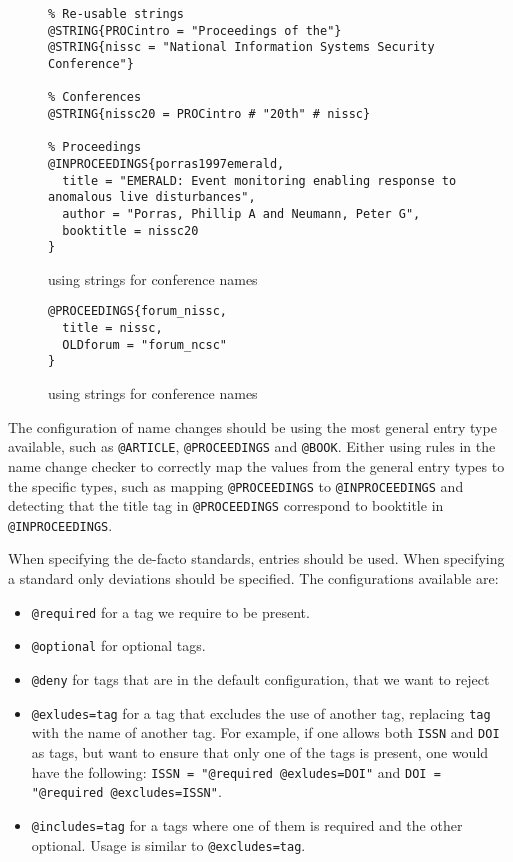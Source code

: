 \begin{figure}
  \centering
\begin{small}
\begin{verbatim}
% Re-usable strings
@STRING{PROCintro = "Proceedings of the"}
@STRING{nissc = "National Information Systems Security Conference"}

% Conferences
@STRING{nissc20 = PROCintro # "20th" # nissc}

% Proceedings
@INPROCEEDINGS{porras1997emerald,
  title = "EMERALD: Event monitoring enabling response to anomalous live disturbances",
  author = "Porras, Phillip A and Neumann, Peter G",
  booktitle = nissc20
}
\end{verbatim}
\end{small}
  \caption{ using strings for conference names}
  \label{fig:analyzing_configuration_name_change_bib_file_strings}
\end{figure}

\begin{figure}
  \centering
\begin{verbatim}
@PROCEEDINGS{forum_nissc,
  title = nissc,
  OLDforum = "forum_ncsc"
}
\end{verbatim}
  \caption{ using strings for conference names}
  \label{fig:analyzing_configuration_name_change_config_file_strings}
\end{figure}

The configuration of name changes should be using the most general
entry type available, such as \texttt{@ARTICLE}, \texttt{@PROCEEDINGS}
and \texttt{@BOOK}.  Either using rules in the name change checker to
correctly map the values from the general entry types to the specific
types, such as mapping \texttt{@PROCEEDINGS} to
\texttt{@INPROCEEDINGS} and detecting that the title tag in
\texttt{@PROCEEDINGS} correspond to booktitle in
\texttt{@INPROCEEDINGS}.


When specifying the de-facto standards, {\bibtex} entries should be
used.  When specifying a standard only deviations should be specified.
The configurations available are:

\begin{itemize}
\item \texttt{@required} for a tag we require to be present.
\item \texttt{@optional} for optional tags.
\item \texttt{@deny} for tags that are in the default configuration,
  that we want to reject
\item \texttt{@exludes=tag} for a tag that excludes the use of another
  tag, replacing \texttt{tag} with the name of another tag.  For
  example, if one allows both \texttt{ISSN} and \texttt{DOI} as tags,
  but want to ensure that only one of the tags is present, one would
  have the following: \texttt{ISSN = "@required @exludes=DOI"} and
  \texttt{DOI = "@required @excludes=ISSN"}.
\item \texttt{@includes=tag} for a tags where one of them is required
  and the other optional.  Usage is similar to \texttt{@excludes=tag}.
\end{itemize}

